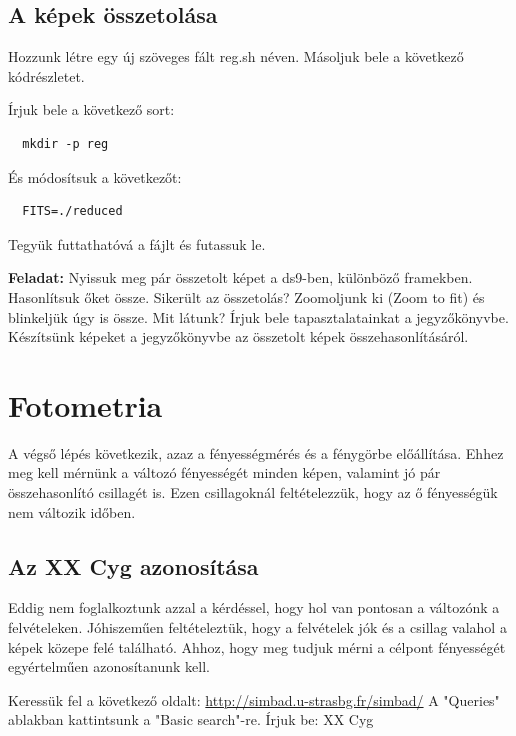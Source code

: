 \documentclass{article}
\begin{document}
\subsection{A képek összetolása}

Hozzunk létre egy új szöveges fált reg.sh néven. Másoljuk bele a következő
kódrészletet.

Írjuk bele a következő sort:
\begin{verbatim}
  mkdir -p reg
\end{verbatim}

És módosítsuk a következőt:

\begin{verbatim}
  FITS=./reduced
\end{verbatim}

Tegyük futtathatóvá a fájlt és futassuk le.

{\bf Feladat:}
Nyissuk meg pár összetolt képet a ds9-ben, különböző framekben. Hasonlítsuk
őket össze. Sikerült az összetolás? Zoomoljunk ki (Zoom to fit) és blinkeljük
úgy is össze. Mit látunk? Írjuk bele tapasztalatainkat a jegyzőkönyvbe.
Készítsünk képeket a jegyzőkönyvbe az összetolt képek összehasonlításáról.

\section{Fotometria}

A végső lépés következik, azaz a fényességmérés és a fénygörbe előállítása.
Ehhez meg kell mérnünk a változó fényességét minden képen, valamint jó pár
összehasonlító csillagét is. Ezen csillagoknál feltételezzük, hogy az ő
fényességük nem változik időben.

\subsection{Az XX Cyg azonosítása}

Eddig nem foglalkoztunk azzal a kérdéssel, hogy hol van pontosan a változónk a
felvételeken. Jóhiszeműen feltételeztük, hogy a felvételek jók és a csillag
valahol a képek közepe felé található. Ahhoz, hogy meg tudjuk mérni a célpont
fényességét egyértelműen azonosítanunk kell.

Keressük fel a következő oldalt:
\url{http://simbad.u-strasbg.fr/simbad/} A "Queries" ablakban kattintsunk a
"Basic search"-re. Írjuk be: XX Cyg
\end{document}
